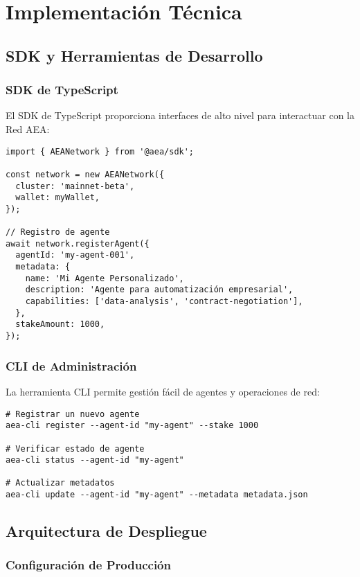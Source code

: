 \documentclass[12pt,a4paper]{article}
\begin{document}
\section{Implementación Técnica}

\subsection{SDK y Herramientas de Desarrollo}

\subsubsection{SDK de TypeScript}

El SDK de TypeScript proporciona interfaces de alto nivel para interactuar con la Red AEA:

\begin{verbatim}
import { AEANetwork } from '@aea/sdk';

const network = new AEANetwork({
  cluster: 'mainnet-beta',
  wallet: myWallet,
});

// Registro de agente
await network.registerAgent({
  agentId: 'my-agent-001',
  metadata: {
    name: 'Mi Agente Personalizado',
    description: 'Agente para automatización empresarial',
    capabilities: ['data-analysis', 'contract-negotiation'],
  },
  stakeAmount: 1000,
});
\end{verbatim}

\subsubsection{CLI de Administración}

La herramienta CLI permite gestión fácil de agentes y operaciones de red:

\begin{verbatim}
# Registrar un nuevo agente
aea-cli register --agent-id "my-agent" --stake 1000

# Verificar estado de agente
aea-cli status --agent-id "my-agent"

# Actualizar metadatos
aea-cli update --agent-id "my-agent" --metadata metadata.json
\end{verbatim}

\subsection{Arquitectura de Despliegue}

\subsubsection{Configuración de Producción}
\end{document}
